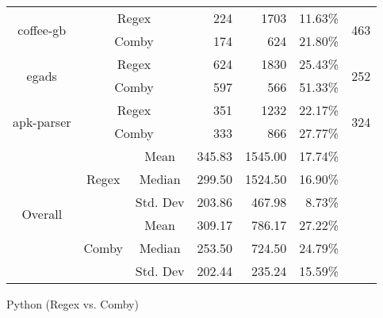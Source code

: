 \documentclass[sigconf,review, anonymous]{acmart}
\begin{document}
{\begin{table}[hbtp]
{\begin{tabular}{|c|c|c|r|r|r|c|}
\multirow{2}{*}{coffee-gb} & \multicolumn{2}{c|}{Regex} & 224 \hspace{8pt} & 1703 \hspace{8pt} & 11.63\% & \multirow{2}{*}{463}\\\cline{2-6}
    & \multicolumn{2}{c|}{Comby} & 174 \hspace{8pt} & 624 \hspace{8pt} & 21.80\% & \\ \hline
\multirow{2}{*}{egads} & \multicolumn{2}{c|}{Regex} & 624 \hspace{8pt} & 1830 \hspace{8pt} & 25.43\% & \multirow{2}{*}{252}\\\cline{2-6}
    & \multicolumn{2}{c|}{Comby} & 597 \hspace{8pt} & 566 \hspace{8pt} & 51.33\% & \\ \hline
\multirow{2}{*}{apk-parser} & \multicolumn{2}{c|}{Regex} & 351 \hspace{8pt} & 1232 \hspace{8pt} & 22.17\% & \multirow{2}{*}{324}\\\cline{2-6}
    & \multicolumn{2}{c|}{Comby} & 333 \hspace{8pt} & 866 \hspace{8pt} & 27.77\% & \\ \hline

\multirow{6}{*}{Overall} & \multirow{3}{*}{Regex} & Mean & 345.83 & 1545.00  & 17.74\%& \\\cline{3-6}
    &   &  Median & 299.50 & 1524.50 & 16.90\%  & \\\cline{3-6}
    &   &  Std. Dev & 203.86 & 467.98 & 8.73\%  & \\\cline{2-6}

 & \multirow{3}{*}{Comby} & Mean & 309.17 & 786.17 & 27.22\% & \\\cline{3-6}
    &   &  Median & 253.50 & 724.50 & 24.79\%  & \\\cline{3-6}
    &   &  Std. Dev & 202.44 & 235.24  & 15.59\%  & \\\hline


\end{tabular}

}
\end{table}


\begin{table}[hbtp]
\centering
\caption{Python (Regex vs. Comby)}
\label{tab:table_python1}
\resizebox{\columnwidth}{!}{%

}
\end{table}}
\end{document}
